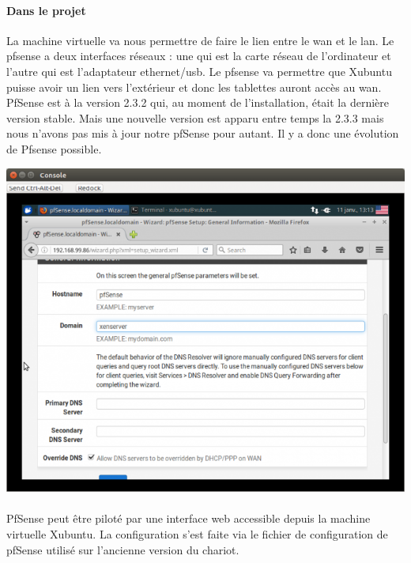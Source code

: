 \documentclass[a4paper,12pt]{extarticle}
\begin{document}
\paragraph{Dans le projet\\}

La machine virtuelle va nous permettre de faire le lien entre le wan et le lan. Le pfsense a deux interfaces réseaux : une qui est la carte réseau de l’ordinateur et l’autre qui est l’adaptateur ethernet/usb. Le pfsense va permettre que Xubuntu puisse avoir un lien vers l’extérieur et donc les tablettes auront accès au wan. 
PfSense est à la version 2.3.2 qui, au moment de l’installation, était la dernière version stable. Mais une nouvelle version est apparu entre temps la 2.3.3 mais nous n’avons pas mis à jour notre pfSense pour autant. Il y a donc une évolution de Pfsense possible. 

\begin{center}
\includegraphics[scale=0.65]{pfsense}\\
\end{center}
\paragraph{}
PfSense peut être piloté par une interface web accessible depuis la machine virtuelle Xubuntu. La configuration s’est faite via le fichier de configuration de pfSense utilisé sur l’ancienne version du chariot.\\
\end{document}
